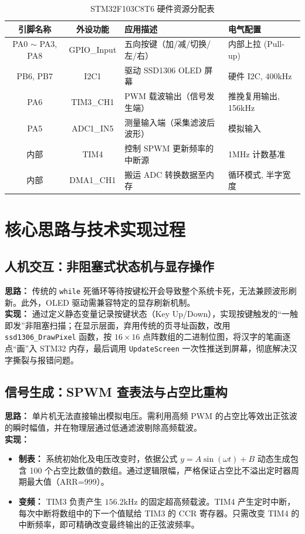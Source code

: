 \documentclass[a4paper,11pt]{ctexart}
\begin{document}
\begin{table}[htbp]
    \centering
    \caption{STM32F103C8T6 硬件资源分配表}
    \vspace{0.5em}
    \begin{tabular}{@{}ccll@{}}
        \toprule
        \textbf{引脚名称} & \textbf{外设功能} & \textbf{应用描述} & \textbf{电气配置} \\ \midrule
        PA0 $\sim$ PA3, PA8 & GPIO\_Input & 五向按键（加/减/切换/左/右） & 内部上拉 (Pull-up) \\
        PB6, PB7 & I2C1 & 驱动 SSD1306 OLED 屏幕 & 硬件 I2C, 400kHz \\
        PA6 & TIM3\_CH1 & PWM 载波输出（信号发生端） & 推挽复用输出, 156kHz \\
        PA5 & ADC1\_IN5 & 测量输入端（采集滤波后波形） & 模拟输入 \\
        内部 & TIM4 & 控制 SPWM 更新频率的中断源 & 1MHz 计数基准 \\
        内部 & DMA1\_CH1 & 搬运 ADC 转换数据至内存 & 循环模式, 半字宽度 \\ \bottomrule
    \end{tabular}
\end{table}

\section{核心思路与技术实现过程}

\subsection{人机交互：非阻塞式状态机与显存操作}
\textbf{思路：} 传统的 \texttt{while} 死循环等待按键松开会导致整个系统卡死，无法兼顾波形刷新。此外，OLED 驱动需兼容特定的显存刷新机制。\\
\textbf{实现：} 
通过定义静态变量记录按键状态（Key Up/Down），实现按键触发的“一触即发”非阻塞扫描；在显示层面，弃用传统的页寻址函数，改用 \texttt{ssd1306\_DrawPixel} 函数，按 $16\times16$ 点阵数组的二进制位图，将汉字的笔画逐点“画”入 STM32 内存，最后调用 \texttt{UpdateScreen} 一次性推送到屏幕，彻底解决汉字撕裂与报错问题。

\subsection{信号生成：SPWM 查表法与占空比重构}
\textbf{思路：} 单片机无法直接输出模拟电压。需利用高频 PWM 的占空比等效出正弦波的瞬时幅值，并在物理层通过低通滤波剔除高频载波。\\
\textbf{实现：}
\begin{itemize}
    \item \textbf{制表：} 系统初始化及电压改变时，依据公式 $y = A \sin(\omega t) + B$ 动态生成包含 100 个占空比数值的数组。通过逻辑限幅，严格保证占空比不溢出定时器周期最大值（ARR=999）。
    \item \textbf{变频：} TIM3 负责产生 $156.2\text{kHz}$ 的固定超高频载波。TIM4 产生定时中断，每次中断将数组中的下一个值赋给 TIM3 的 CCR 寄存器。只需改变 TIM4 的中断频率，即可精确改变最终输出的正弦波频率。
\end{itemize}
\end{document}
